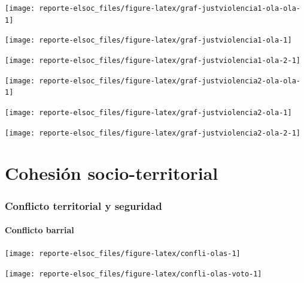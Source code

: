 \documentclass[
  12pt,
]{book}
\begin{document}
\begin{center}\texttt{[image: reporte-elsoc\_files/figure-latex/graf-justviolencia1-ola-ola-1]} \end{center}

\begin{center}\texttt{[image: reporte-elsoc\_files/figure-latex/graf-justviolencia1-ola-1]} \end{center}

\begin{center}\texttt{[image: reporte-elsoc\_files/figure-latex/graf-justviolencia1-ola-2-1]} \end{center}

\begin{center}\texttt{[image: reporte-elsoc\_files/figure-latex/graf-justviolencia2-ola-ola-1]} \end{center}

\begin{center}\texttt{[image: reporte-elsoc\_files/figure-latex/graf-justviolencia2-ola-1]} \end{center}

\begin{center}\texttt{[image: reporte-elsoc\_files/figure-latex/graf-justviolencia2-ola-2-1]} \end{center}

\hypertarget{cohesiuxf3n-socio-territorial}{%
\chapter{Cohesión socio-territorial}\label{cohesiuxf3n-socio-territorial}}

\hypertarget{conflicto-territorial-y-seguridad}{%
\subsection{Conflicto territorial y seguridad}\label{conflicto-territorial-y-seguridad}}

\hypertarget{conflicto-barrial}{%
\subsubsection{Conflicto barrial}\label{conflicto-barrial}}

\begin{center}\texttt{[image: reporte-elsoc\_files/figure-latex/confli-olas-1]} \end{center}

\begin{center}\texttt{[image: reporte-elsoc\_files/figure-latex/confli-olas-voto-1]} \end{center}
\end{document}
